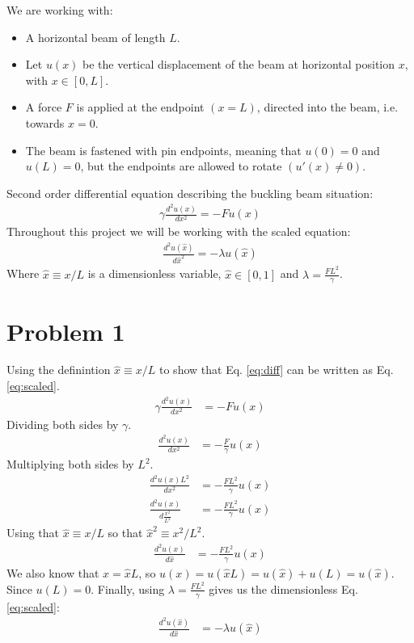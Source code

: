 \documentclass[english,notitlepage]{revtex4-1}  %
\begin{document}
We are working with:
\begin{itemize}
    \item A horizontal beam of length $L$.

    \item Let $u(x)$ be the vertical displacement of the beam at horizontal position $x$, with $x \in [0,L]$.

    \item A force $F$ is applied at the endpoint $(x = L)$, directed into the beam, i.e. towards $x = 0$.

    \item The beam is fastened with pin endpoints, meaning that $u(0) = 0$ and $u(L) = 0$, but the endpoints are allowed to rotate $(u'(x) \neq 0)$.
\end{itemize}
Second order differential equation describing the buckling beam situation:
\begin{align}
    \gamma \frac{d^2u(x)}{dx^2} = - F u(x)
    \label{eq:diff}
\end{align}
Throughout this project we will be working with the scaled equation:
\begin{align}
    \frac{d^2u(\hat{x})}{d \hat{x}^2} = - \lambda u(\hat{x})
    \label{eq:scaled}
\end{align}
Where $\hat{x} \equiv x / L$ is a dimensionless variable, $\hat{x} \in [0,1]$ and $\lambda = \frac{FL^2}{\gamma}$.

\section*{Problem 1}
Using the definintion $\hat{x} \equiv x / L$ to show that Eq. \ref*{eq:diff} can be written as Eq. \ref*{eq:scaled}.
\begin{align*}
    \gamma \frac{d^2u(x)}{dx^2} &= - F u(x)
\end{align*}
Dividing both sides by $\gamma$.
\begin{align*}
    \frac{d^2u(x)}{dx^2} &= - \frac{F}{\gamma} u(x)
\end{align*}
Multiplying both sides by $L^2$.
\begin{align*}
    \frac{d^2u(x)L^2}{dx^2} &= - \frac{FL^2}{\gamma} u(x) \\
    \frac{d^2u(x)}{d\frac{x^2}{L^2}} &= - \frac{FL^2}{\gamma} u(x)
\end{align*}
Using that $\hat{x} \equiv x / L$ so that $\hat{x}^2 \equiv x^2 / L^2$.
\begin{align*}
    \frac{d^2u(x)}{d\hat{x}} &= - \frac{FL^2}{\gamma} u(x)
\end{align*}
We also know that $x = \hat{x}L$, so $u(x) = u(\hat{x}L) = u(\hat{x}) + u(L) = u(\hat{x})$. Since $u(L) = 0$. Finally, using $\lambda = \frac{FL^2}{\gamma}$ gives us the dimensionless Eq. \ref*{eq:scaled}:
\begin{align*}
    \frac{d^2u(\hat{x})}{d\hat{x}} &= - \lambda u(\hat{x})
\end{align*}
\end{document}
